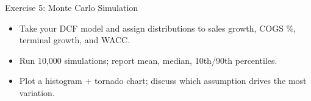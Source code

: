 \documentclass[aspectratio=169]{beamer}
\begin{document}
\begin{frame}{Exercise 5: Monte Carlo Simulation}
\begin{itemize}
  \item Take your DCF model and assign distributions to sales growth, COGS \%, terminal growth, and WACC.
  \item Run 10{,}000 simulations; report mean, median, 10th/90th percentiles.
  \item Plot a histogram + tornado chart; discuss which assumption drives the most variation.
\end{itemize}
\end{frame}
\end{document}
